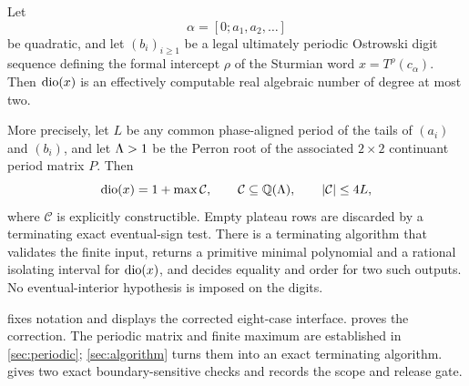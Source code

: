 \begin{theorem}
\label{thm:main}
Let
\[
  \alpha=[0;a_1,a_2,\ldots]
\]
be quadratic, and let $(b_i)_{i\geq1}$ be a legal ultimately periodic
Ostrowski digit sequence defining the formal intercept $\rho$ of the Sturmian
word $x=T^\rho(c_\alpha)$.  Then $\operatorname{dio}(x)$ is an effectively computable real
algebraic number of degree at most two.

More precisely, let $L$ be any common phase-aligned period of the tails of
$(a_i)$ and $(b_i)$, and let $\Lambda>1$ be the Perron root of the associated
$2\times2$ continuant period matrix $P$.  Then
\[
  \operatorname{dio}(x)=1+\max \mathcal C,
  \qquad
  \mathcal C\subseteq\mathbb{Q}(\Lambda),
  \qquad
  |\mathcal C|\leq4L,
\]
where $\mathcal C$ is explicitly constructible.  Empty plateau rows are
discarded by a terminating exact eventual-sign test.  There is a terminating
algorithm that validates the finite input, returns a primitive minimal
polynomial and a rational isolating interval for $\operatorname{dio}(x)$, and decides
equality and order for two such outputs.  No eventual-interior hypothesis is
imposed on the digits.
\end{theorem}

 fixes notation and displays the corrected eight-case
interface.   proves the correction.  The periodic matrix
and finite maximum are established in \cref{sec:periodic};
\cref{sec:algorithm} turns them into an exact terminating algorithm.
 gives two exact boundary-sensitive checks and records the
scope and release gate.
